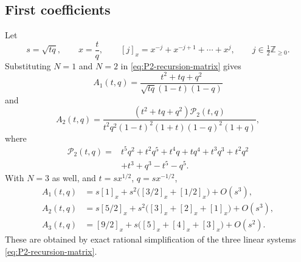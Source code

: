 \documentclass{amsart}
\theoremstyle{definition}
\numberwithin{equation}{section}
\newcommand{\Z}{\mathbb Z}
\begin{document}
\subsection{First coefficients}
Let
\[
 s=\sqrt{tq},\qquad x=\frac tq,\qquad
 [j]_x=x^{-j}+x^{-j+1}+\cdots+x^j,
 \qquad j\in\tfrac12\Z_{\geq0}.
\]
Substituting \(N=1\) and \(N=2\) in \eqref{eq:P2-recursion-matrix} gives
\begin{equation}
 A_1(t,q)=
 \frac{t^2+tq+q^2}{\sqrt{tq}(1-t)(1-q)}
\label{eq:P2-A1-from-recursion}
\end{equation}
and
\begin{equation}
 A_2(t,q)=
 \frac{(t^2+tq+q^2)\mathcal P_2(t,q)}
 {t^2q^2(1-t)^2(1+t)(1-q)^2(1+q)},
\label{eq:P2-A2-from-recursion}
\end{equation}
where
\begin{equation}
\begin{aligned}
 \mathcal P_2(t,q)={}&t^5q^2+t^2q^5+t^4q+tq^4+t^3q^3+t^2q^2\\
 &+t^3+q^3-t^5-q^5.
\end{aligned}
\label{eq:P2-A2-numerator}
\end{equation}
With \(N=3\) as well, and \(t=sx^{1/2}\), \(q=sx^{-1/2}\),
\begin{equation}
\begin{aligned}
 A_1(t,q)&=s[1]_x
  +s^2\bigl([3/2]_x+[1/2]_x\bigr)+O(s^3),\\
 A_2(t,q)&=s[5/2]_x
  +s^2\bigl([3]_x+[2]_x+[1]_x\bigr)+O(s^3),\\
 A_3(t,q)&=[9/2]_x
  +s\bigl([5]_x+[4]_x+[3]_x\bigr)+O(s^2).
\end{aligned}
\label{eq:P2-first-three-recursive-expansions}
\end{equation}
These are obtained by exact rational simplification of the three linear systems \eqref{eq:P2-recursion-matrix}.
\end{document}
